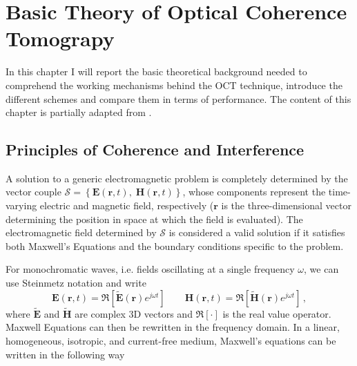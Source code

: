 
\chapter{Basic Theory of Optical Coherence Tomograpy} %
\label{ch:theory} %

In this chapter I will report the basic theoretical background needed to comprehend the working mechanisms behind the OCT technique, introduce the different schemes and compare them in terms of performance. The content of this chapter is partially adapted from \cite{Midrio2006,Someda2006,Wolf1999}. 


\section{Principles of Coherence and Interference}
A solution to a generic electromagnetic problem is completely determined by the vector couple $\mathcal{S} = \left\{\mathbf{E}(\mathbf{r}, t),\; \mathbf{H}(\mathbf{r}, t)\right\}$, whose components represent the time-varying electric and magnetic field, respectively ($\textbf{r}$ is the three-dimensional vector determining the position in space at which the field is evaluated). The electromagnetic field determined by $\mathcal{S}$ is considered a valid solution if it satisfies both Maxwell's Equations and the boundary conditions specific to the problem. 

For monochromatic waves, i.e. fields oscillating at a single frequency $\omega$, we can use Steinmetz notation and write
\begin{equation}\label{eq:steinmetz}
	\textbf{E}(\textbf{r}, t) = \Re\left[\widetilde{\mathbf{E}}(\textbf{r})e^{j\omega t}\right] \qquad \textbf{H}(\textbf{r}, t) = \Re\left[\widetilde{\mathbf{H}}(\textbf{r})e^{j\omega t}\right]\,,
\end{equation}
where $\widetilde{\textbf{E}}$ and $\widetilde{\textbf{H}}$ are complex 3D vectors and $\Re\left[\cdot\right]$ is the real value operator. Maxwell Equations can then be rewritten in the frequency domain. In a linear, homogeneous, isotropic, and current-free medium, Maxwell's equations can be written in the following way

